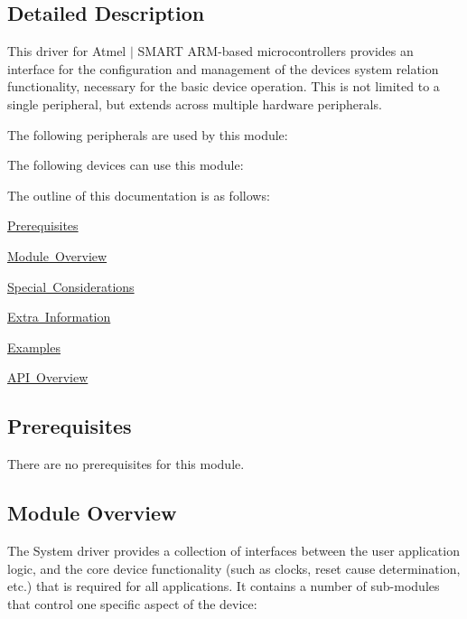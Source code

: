 \subsection{Detailed Description}
This driver for Atmel\textregistered{} $\vert$ S\+M\+A\+RT A\+RM\textregistered{}-\/based microcontrollers provides an interface for the configuration and management of the device\textquotesingle{}s system relation functionality, necessary for the basic device operation. This is not limited to a single peripheral, but extends across multiple hardware peripherals.

The following peripherals are used by this module\+:

The following devices can use this module\+:

The outline of this documentation is as follows\+:
\begin{DoxyItemize}
\item \mbox{\hyperlink{group__asfdoc__sam0__system__group_asfdoc_sam0_system_prerequisites}{Prerequisites}}
\item \mbox{\hyperlink{group__asfdoc__sam0__system__group_asfdoc_sam0_system_module_overview}{Module Overview}}
\item \mbox{\hyperlink{group__asfdoc__sam0__system__group_asfdoc_sam0_system_special_considerations}{Special Considerations}}
\item \mbox{\hyperlink{group__asfdoc__sam0__system__group_asfdoc_sam0_system_extra_info}{Extra Information}}
\item \mbox{\hyperlink{group__asfdoc__sam0__system__group_asfdoc_sam0_system_examples}{Examples}}
\item \mbox{\hyperlink{group__asfdoc__sam0__system__group_asfdoc_sam0_system_api_overview}{A\+PI Overview}}
\end{DoxyItemize}\hypertarget{group__asfdoc__sam0__system__group_asfdoc_sam0_system_prerequisites}{}\subsection{Prerequisites}\label{group__asfdoc__sam0__system__group_asfdoc_sam0_system_prerequisites}
There are no prerequisites for this module.\hypertarget{group__asfdoc__sam0__system__group_asfdoc_sam0_system_module_overview}{}\subsection{Module Overview}\label{group__asfdoc__sam0__system__group_asfdoc_sam0_system_module_overview}
The System driver provides a collection of interfaces between the user application logic, and the core device functionality (such as clocks, reset cause determination, etc.) that is required for all applications. It contains a number of sub-\/modules that control one specific aspect of the device\+:


